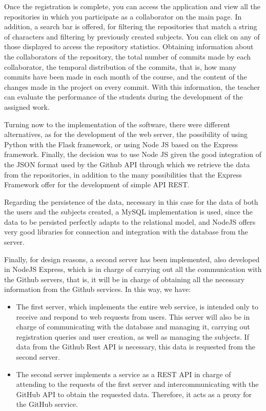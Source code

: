 Once the registration is complete, you can access the application and
view all the repositories in which you participate as a collaborator
on the main page. In addition, a search bar is offered, for filtering
the repositories that match a string of characters and filtering by
previously created subjects. You can click on any of those displayed
to access the repository statistics. Obtaining information about the
collaborators of the repository, the total number of commits made by
each collaborator, the temporal distribution of the commits, that is,
how many commits have been made in each month of the course, and the
content of the changes made in the project on every commit. With this
information, the teacher can evaluate the performance of the students
during the development of the assigned work.

Turning now to the implementation of the software, there were
different alternatives, as for the development of the web server, the
possibility of using Python with the Flask framework, or using Node JS
based on the Express framework. Finally, the decision was to use Node
JS given the good integration of the JSON format used by the Github
API through which we retrieve the data from the repositories, in
addition to the many possibilities that the Express Framework offer
for the development of simple API REST.

Regarding the persistence of the data, necessary in this case for the
data of both the users and the subjects created, a MySQL
implementation is used, since the data to be persisted perfectly
adapts to the relational model, and NodeJS offers very good libraries
for connection and integration with the database from the server.

Finally, for design reasons, a second server has been implemented,
also developed in NodeJS Express, which is in charge of carrying out
all the communication with the Github servers, that is, it will be in
charge of obtaining all the necessary information from the Github
services. In this way, we have:

\begin{itemize}
\item The first server, which implements the entire web service, is
  intended only to receive and respond to web requests from users.
  This server will also be in charge of communicating with the
  database and managing it, carrying out registration queries and user
  creation, as well as managing the subjects. If data from the Github
  Rest API is necessary, this data is requested from the second
  server.

\item The second server implements a service as a REST API in charge
  of attending to the requests of the first server and
  intercommunicating with the GitHub API to obtain the requested data.
  Therefore, it acts as a proxy for the GitHub service.
\end{itemize}

